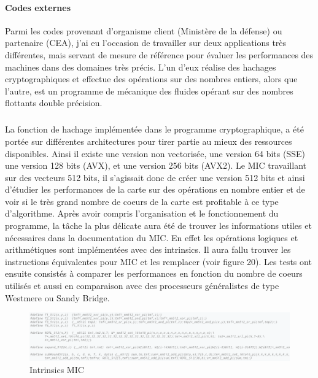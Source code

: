 \documentclass[11pt]{article}
\begin{document}
				\paragraph{Codes externes}
				Parmi les codes provenant d'organisme client (Ministère de la défense) ou partenaire (CEA), j'ai eu l'occasion 
				de travailler sur deux applications très différentes, mais servant de mesure de référence pour évaluer les 
				performances des machines dans des domaines très précis. L'un d'eux réalise des hachages cryptographiques et 
				effectue des opérations sur des nombres entiers, alors que l'autre, est un programme de mécanique des fluides 
				opérant sur des nombres flottants double précision.
					\subparagraph{}
					La fonction de hachage implémentée dans le programme cryptographique, a été portée sur différentes architectures 
					pour tirer partie au mieux des ressources disponibles. Ainsi il existe une version non vectorisée, une version 64 bits (SSE) 
					une version 128 bits (AVX), et une version 256 bits (AVX2). Le MIC travaillant sur des vecteurs 512 bits, 
					il s'agissait donc de créer une version 512 bits et ainsi d'étudier les performances de la carte sur des 
					opérations en nombre entier et de voir si le très grand nombre de coeurs de la carte est profitable à ce 
					type d'algorithme. \newline
					Après avoir compris l'organisation et le fonctionnement du programme, la tâche la plus délicate aura été
					de trouver les informations utiles et nécessaires dans la documentation du MIC. En effet les opérations 
					logiques et arithmétiques sont implémentées avec des intrinsics. Il aura fallu trouver les instructions 
					équivalentes pour MIC et les remplacer (voir figure 20). \newline
					Les tests ont ensuite consistés à comparer les performances en fonction du nombre de coeurs utilisés et 
					aussi en comparaison avec des processeurs généralistes de type Westmere ou Sandy Bridge.
					\begin{figure}
					\begin{center}
					\includegraphics[scale=0.5]{intrinsics.png}
					\caption{Intrinsics MIC}
					\end{center}
					\end{figure}
\end{document}
